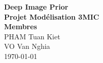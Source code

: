 \onehalfspacing


\vspace*{\fill}
\begin{center}
\LARGE{\textbf{Deep Image Prior}}\\
\Large{\textbf{Projet Modélisation 3MIC}}\\
\vspace*{1\baselineskip}
\Large{\textbf{Membres}}\\
PHAM Tuan Kiet\\
VO Van Nghia\\
\vfill %
\vspace*{\fill}
\today
\end{center}

\newpage

\newpage
{}
\tableofcontents
{}

\listoffigures

\newpage
{}
\doublespacing
